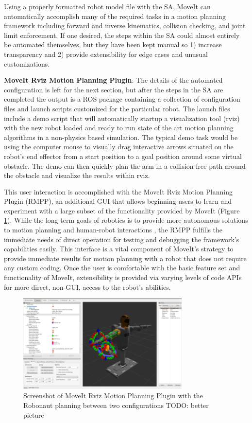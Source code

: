 \documentclass[10pt,journal,compsoc]{joser1}
\begin{document}
{Using a properly formatted robot model file with the SA, MoveIt can automatically accomplish many of the required tasks in a motion planning framework including forward and inverse kinematics, collision checking, and joint limit enforcement. If one desired, the steps within the SA could almost entirely be automated themselves, but they have been kept manual so 1) increase transparency and 2) provide extensibility for edge cases and unusual customizations.

{\bf MoveIt Rviz Motion Planning Plugin}: The details of the automated configuration is left for the next section, but after the steps in the SA are completed the output is a ROS package containing a collection of configuration files and launch scripts customized for the particular robot. The launch files include a demo script that will automatically startup a visualization tool (rviz) with the new robot loaded and ready to run state of the art motion planning algorithms in a non-physics based simulation. The typical demo task would be using the computer mouse to visually drag interactive arrows situated on the robot's end effector from a start position to a goal position around some virtual obstacle. The demo can then quickly plan the arm in a collision free path around the obstacle and visualize the results within rviz. 

This user interaction is accomplished with the MoveIt Rviz Motion Planning Plugin (RMPP), an additional GUI that allows beginning users to learn and experiment with a large subset of the functionality provided by MoveIt (Figure \ref{fig:motionrvizplugin}). While the long term goals of robotics is to provide more autonomous solutions to motion planning and human-robot interactions \cite{yancotaxonomy}, the RMPP fulfills the immediate needs of direct operation for testing and debugging the framework's capabilities easily. This interface is a vital component of MoveIt's strategy to provide immediate results for motion planning with a robot that does not require any custom coding. Once the user is comfortable with the basic feature set and functionality of MoveIt, extensibility is provided via varying levels of code APIs for more direct, non-GUI, access to the robot's abilities.

\begin{figure}[!t]
\centering
\includegraphics[width=3.4in]{images/rviz_plugin}
\caption{Screenshot of MoveIt Rviz Motion Planning Plugin with the Robonaut planning between two configurations TODO: better picture}
\label{fig:motionrvizplugin}
\end{figure}

}
\end{document}
